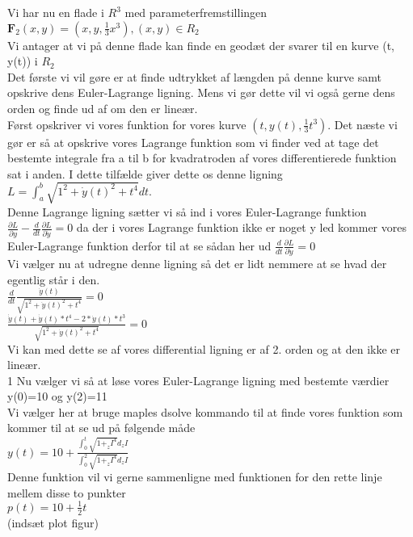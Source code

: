 
Vi har nu en flade i $R^3$ med parameterfremstillingen \\
$\textbf{F}_{2}(x,y)=(x, y, \frac{1}{3}x^3), (x,y) \in R_{2} $\\
Vi antager at vi på denne flade kan finde en geodæt  der svarer til en kurve (t, y(t)) i $R_{2}$ \\
Det første vi vil gøre er at finde udtrykket af længden på denne kurve samt opskrive dens Euler-Lagrange ligning. Mens vi gør dette vil vi også gerne dens orden og finde ud af om den er lineær. \\
Først opskriver vi vores funktion for vores kurve $(t,y(t), \frac{1}{3} t^3)$. Det næste vi gør er så at opskrive vores Lagrange funktion som vi finder ved at tage det bestemte integrale fra a til b for kvadratroden af vores differentierede funktion sat i anden. I dette tilfælde giver dette os denne ligning \\
$L=\int_{a}^{b} \sqrt{1^2+ \dot{y}(t)^2+t^4}dt. $\\
Denne Lagrange ligning sætter vi så ind i vores Euler-Lagrange funktion $ \frac{ \partial L}{ \partial y}-  \frac{d}{dt} \frac{ \partial L}{ \partial \dot{y}}=0$ da der i vores Lagrange funktion ikke er noget y led kommer vores Euler-Lagrange funktion derfor til at se sådan her ud $ \frac{d}{dt} \frac{ \partial L}{ \partial \dot{y}}=0 $\\
Vi vælger nu at udregne denne ligning så det er lidt nemmere at se hvad der egentlig står i den. \\
$ \frac{d}{dt} \frac{ \dot{y}(t)}{ \sqrt{1^2+ \dot{y}(t)^2+t^4}}=0  $\\
$ \frac{ \dot{ \dot{y}}(t)+ \dot{ \dot{y}}(t)*t^4-2* \dot{y}(t)*t^3}{\sqrt{1^2+ \dot{y}(t)^2+t^4}}=0 $\\
Vi kan med dette se af vores differential ligning er af 2. orden og at den ikke er lineær. \\1
Nu vælger vi så at løse vores Euler-Lagrange ligning med bestemte værdier y(0)=10 og y(2)=11 \\
Vi vælger her at bruge maples dsolve kommando til at finde vores funktion som kommer til at se ud på følgende måde \\
$y(t)=10+ \frac{\int_{0}^{t}\sqrt{1+_zI^4}d_zI}{\int_{0}^{2}\sqrt{1+_zI^4}d_zI} $ \\
Denne funktion vil vi gerne sammenligne med funktionen for den rette linje mellem disse to punkter \\
$p(t)=10+ \frac{1}{2}t $ \\
(indsæt plot figur) \\
